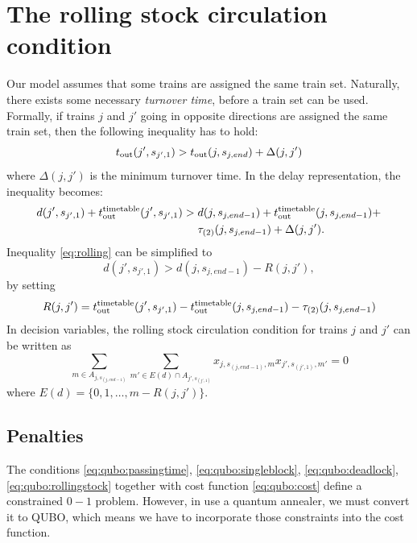 \section{The rolling stock circulation condition}
Our model assumes that some trains are assigned the same train set. Naturally,
there exists some necessary \emph{turnover time}, before a train set can be
used. Formally, if trains $j$ and $j'$ going in opposite directions are
assigned the same train set, then the following inequality has to hold:
\begin{equation}
  t_\text{out}(j', s_{j',1}) > t_\text{out}(j, s_{j,end}) + \Delta(j, j')
\end{equation}
where $\Delta(j, j')$ is the minimum turnover time. In the delay
representation, the inequality becomes:
\begin{equation}
  \label{eq:rolling}
  \begin{split}
    d(j',s_{j',1}) + t_\text{out}^\text{timetable}(j',s_{j',1}) > & \; d(j, s_{j,end-1}) + t_\text{out}^\text{timetable}(j, s_{j,end-1}) + \\
    & \; \tau_{(2)}(j, s_{j,end-1}) + \Delta(j,j').
  \end{split}
\end{equation}
Inequality \eqref{eq:rolling} can be simplified to
\begin{equation}
  d(j',s_{j',1}) > d(j, s_{j,end-1}) - R(j,j'),
\end{equation}
by setting
\begin{equation}
  \label{eq:rolling2}
  R(j, j') = t_\text{out}^\text{timetable}(j',s_{j',1}) - t_\text{out}^\text{timetable}(j, s_{j,end-1}) - \tau_{(2)}(j,s_{j,end-1})
\end{equation}
In decision variables, the rolling stock circulation condition for trains $j$
and $j'$ can be written as
\begin{equation}
  \label{eq:qubo:rollingstock}
  \sum_{m \in A_{j, s_{(j, end-1)}}} \sum_{m' \in E(d) \cap A_{j',s_{(j',1)}}} x_{j,s_{(j,end-1)},m}x_{j', s_{(j',1)},m'} = 0
\end{equation}
where $E(d) = \{0, 1, \ldots, m-R(j, j')\}$.

\subsection{Penalties}
The conditions \eqref{eq:qubo:passingtime}, \eqref{eq:qubo:singleblock},
\eqref{eq:qubo:deadlock}, \eqref{eq:qubo:rollingstock} together with cost
function \eqref{eq:qubo:cost} define a constrained $0-1$ problem. However, in
use a quantum annealer, we must convert it to QUBO, which means we have to
incorporate those constraints into the cost function.


